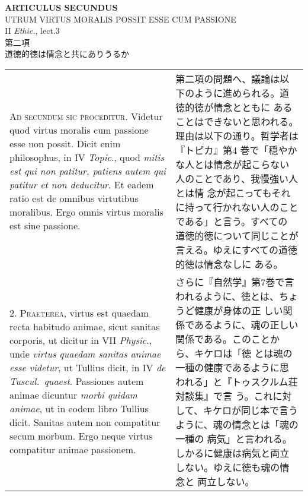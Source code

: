 \documentclass[10pt]{jsarticle}
\begin{document}
\begin{center}
{\Large {\bf ARTICULUS SECUNDUS}}\\
{\large UTRUM VIRTUS MORALIS POSSIT ESSE CUM PASSIONE}\\
{\footnotesize II {\itshape Ethic.}, lect.3}\\
{\Large 第二項\\道徳的徳は情念と共にありうるか}
\end{center}

\begin{longtable}{p{21em}p{21em}}

{\scshape Ad secundum sic proceditur}. Videtur quod virtus moralis cum
passione esse non possit. Dicit enim philosophus, in IV {\itshape
Topic}., quod {\itshape mitis est qui non patitur, patiens autem qui
patitur et non deducitur}. Et eadem ratio est de omnibus virtutibus
moralibus. Ergo omnis virtus moralis est sine passione.


&

 第二項の問題へ、議論は以下のように進められる。道徳的徳が情念とともに
 あることはできないと思われる。理由は以下の通り。哲学者は『トピカ』第4
 巻で「穏やかな人とは情念が起こらない人のことであり、我慢強い人とは情
 念が起こってもそれに持って行かれない人のことである」と言う。すべての
 道徳的徳について同じことが言える。ゆえにすべての道徳的徳は情念なしに
 ある。
 
\\



2. {\scshape Praeterea}, virtus est quaedam recta habitudo animae,
sicut sanitas corporis, ut dicitur in VII {\itshape Physic}., unde
{\itshape virtus quaedam sanitas animae esse videtur}, ut Tullius
dicit, in IV {\itshape de Tuscul.~quaest}. Passiones autem animae
dicuntur {\itshape morbi quidam animae}, ut in eodem libro Tullius
dicit. Sanitas autem non compatitur secum morbum. Ergo neque virtus
compatitur animae passionem.

&

さらに『自然学』第7巻で言われるように、徳とは、ちょうど健康が身体の正
しい関係であるように、魂の正しい関係である。このことから、キケロは「徳
とは魂の一種の健康であるように思われる」と『トゥスクルム荘対談集』で言
う。これに対して、キケロが同じ本で言うように、魂の情念とは「魂の一種の
病気」と言われる。しかるに健康は病気と両立しない。ゆえに徳も魂の情念と
両立しない。
 
\\




\end{longtable}
\end{document}
